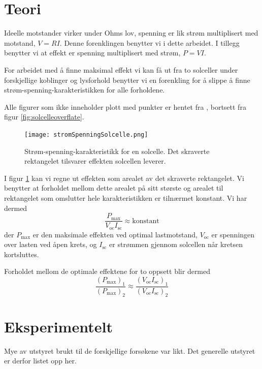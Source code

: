 \documentclass[a4paper,11pt, twocolumn]{article}
\begin{document}
\section{Teori}
Ideelle motstander virker under Ohms lov, spenning er lik strøm multiplisert med motstand, $V=RI$. Denne forenklingen benytter vi i dette arbeidet. I tillegg benytter vi at effekt er spenning multiplisert med strøm, $P = VI$.

For arbeidet med å finne maksimal effekt vi kan få ut fra to solceller under forskjellige koblinger og lysforhold benytter vi en forenkling for å slippe å finne strøm-spenning-karakteristikken for alle forholdene.

Alle figurer som ikke inneholder plott med punkter er hentet fra \cite{solcellen}, bortsett fra figur \ref{fig:solcelleoverflate}.

\begin{figure}[!ht]
	\texttt{[image: stromSpenningSolcelle.png]}
	\caption{Strøm-spenning-karakteristikk for en solcelle. Det skraverte rektangelet tilsvarer effekten solcellen leverer.}
	\label{fig:powerCurrentVoltage}
\end{figure}

I figur \ref{fig:powerCurrentVoltage} kan vi regne ut effekten som arealet av det skraverte rektangelet. Vi benytter at forholdet mellom dette arealet på sitt største og arealet til rektangelet som omslutter hele karakteristikken er tilnærmet konstant. Vi har dermed 
\begin{equation}
	\frac{P_\text{max}}{V_\text{oc}I_\text{sc}}\approx\text{konstant}
\end{equation}
der $P_\text{max}$ er den maksimale effekten ved optimal lastmotstand, $V_\text{oc}$ er spenningen over lasten ved åpen krets, og $I_\text{sc}$ er strømmen gjennom solcellen når kretsen kortsluttes.

Forholdet mellom de optimale effektene for to oppsett blir dermed
\begin{equation}
	\frac{(P_\text{max})_1}{(P_\text{max})_2} \approx \frac{(V_\text{oc}I_\text{sc})_1}{(V_\text{oc}I_\text{sc})_2}
	\label{eq:forhold}
\end{equation}

\section{Eksperimentelt}
Mye av utstyret brukt til de forskjellige forsøkene var likt. Det generelle utstyret er derfor listet opp her.
\end{document}
